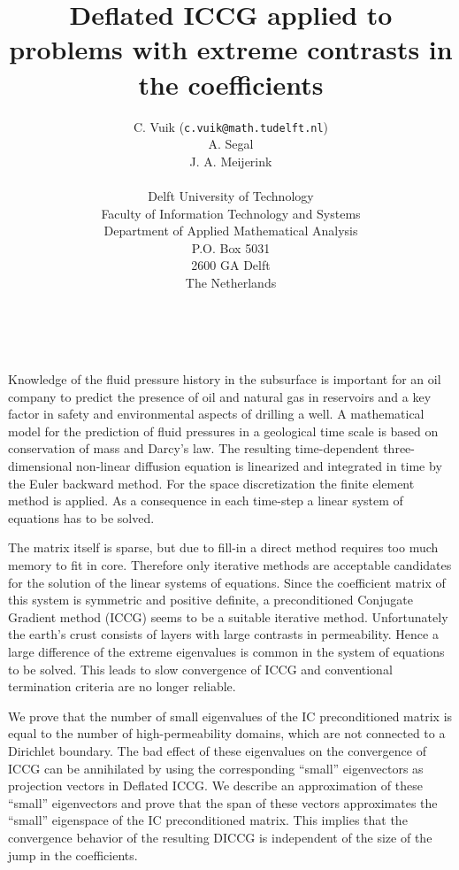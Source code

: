 \documentclass{article}
\date{ ~ \hspace{-4mm}}
\title{Deflated ICCG applied to problems with extreme contrasts in the coefficients  }
\author{C. Vuik ({\tt c.vuik@math.tudelft.nl}) \\ A. Segal \\ J. A. Meijerink \\ \\ Delft University of Technology  \\  Faculty of Information Technology and Systems  \\  Department of Applied Mathematical Analysis  \\  P.O. Box 5031  \\  2600 GA Delft  \\  The Netherlands}
\begin{document}
\maketitle
\thispagestyle{empty}





 




Knowledge of the fluid pressure history in the subsurface is important
for an
oil company to predict the presence of oil and natural gas in reservoirs
and a
key factor in safety and environmental aspects of drilling a well.
A mathematical  model for the prediction of fluid pressures in a
geological
time scale is based on conservation of mass and Darcy's law. The
resulting time-dependent three-dimensional non-linear
diffusion equation is linearized and
integrated in time by the Euler backward method. For the space
discretization the finite element method is applied. As a consequence in
each time-step a linear system of equations has to be
solved.



The matrix itself is sparse, but due to fill-in a
direct method requires too much memory to fit in core. Therefore only
iterative methods are
acceptable candidates for the solution of the linear systems of
equations.
Since the coefficient matrix of this system is symmetric and positive
definite, a
preconditioned Conjugate Gradient method (ICCG)
seems to be a suitable iterative method. Unfortunately the earth's crust
consists of layers with large contrasts in permeability. Hence a large
difference of the extreme eigenvalues
 is common in the system of equations to be solved. This leads
to slow convergence of ICCG and conventional termination criteria
are no longer reliable.



We prove that the number of small eigenvalues of the IC preconditioned
matrix is equal to the number of high-permeability
domains, which are not connected to a Dirichlet boundary.
The bad effect of these eigenvalues on the convergence of ICCG
can be annihilated by using the corresponding ``small'' eigenvectors as
projection vectors in Deflated  ICCG.
We describe an approximation of these ``small'' eigenvectors and prove
that the span of these vectors approximates the
``small'' eigenspace of the IC preconditioned matrix.
This implies that the convergence behavior of the
resulting DICCG is independent
of the size of the jump in the coefficients.
\end{document}
